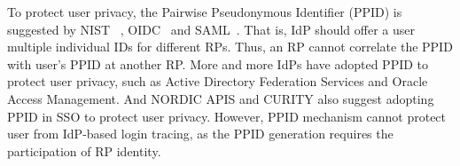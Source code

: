

To protect user privacy, the Pairwise Pseudonymous Identifier (PPID) is suggested by NIST~\cite{NIST2017draft} , OIDC~\cite{OpenIDConnect} and SAML~\cite{SAMLIdentifier}.
That is, IdP should offer a user multiple individual IDs for different RPs. 
Thus, an RP cannot  correlate the  PPID  with user's PPID at another RP. 
More and more IdPs have adopted PPID to protect user privacy, such as Active Directory Federation Services and Oracle Access Management.
And NORDIC APIS and CURITY also suggest adopting PPID in SSO to protect user privacy.
However, PPID mechanism cannot protect user from IdP-based login tracing, as the PPID generation requires the participation of RP identity.

